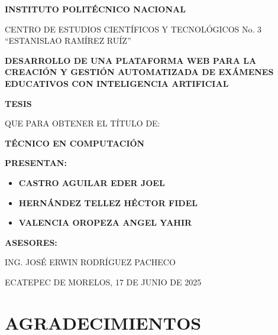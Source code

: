 \documentclass[12pt,a4paper]{report}
\begin{document}
\begin{titlepage}
\thispagestyle{titlepage}
\centering

\vspace*{1cm}

{\Large \textbf{INSTITUTO POLITÉCNICO NACIONAL}}

\vspace{0.5cm}

{\large CENTRO DE ESTUDIOS CIENTÍFICOS Y TECNOLÓGICOS No. 3 ``ESTANISLAO RAMÍREZ RUÍZ''}

\vspace{2cm}

{\LARGE \textbf{DESARROLLO DE UNA PLATAFORMA WEB PARA LA CREACIÓN Y GESTIÓN AUTOMATIZADA DE EXÁMENES EDUCATIVOS CON INTELIGENCIA ARTIFICIAL}}

\vspace{2cm}

{\Large \textbf{TESIS}}

\vspace{0.5cm}

{\large QUE PARA OBTENER EL TÍTULO DE:}

{\Large \textbf{TÉCNICO EN COMPUTACIÓN}}

\vspace{1.5cm}

{\large \textbf{PRESENTAN:}}

\vspace{0.5cm}

\begin{itemize}
\item \textbf{CASTRO AGUILAR EDER JOEL}
\item \textbf{HERNÁNDEZ TELLEZ HÉCTOR FIDEL}
\item \textbf{VALENCIA OROPEZA ANGEL YAHIR}
\end{itemize}

\vspace{1cm}

{\large \textbf{ASESORES:}}

{\large ING. JOSÉ ERWIN RODRÍGUEZ PACHECO}

\vfill

{\large ECATEPEC DE MORELOS, 17 DE JUNIO DE 2025}

\end{titlepage}

\thispagestyle{titlepage}
\chapter*{AGRADECIMIENTOS}
\end{document}
